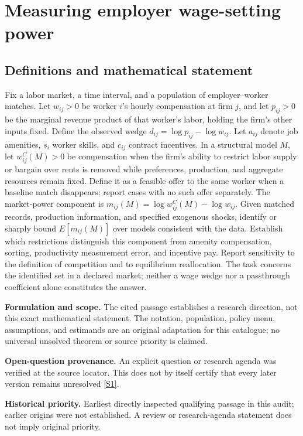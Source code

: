 \documentclass[11pt]{article}
\newcommand{\sref}[2]{\hyperlink{source:#1:#2}{[S#2]}}
\begin{document}
\section*{Measuring employer wage-setting power}\label{30007632}
\subsection{Definitions and mathematical statement}
Fix a labor market, a time interval, and a population of employer--worker matches. Let \(w_{ij}>0\) be worker \(i\)'s hourly compensation at firm \(j\), and let \(p_{ij}>0\) be the marginal revenue product of that worker's labor, holding the firm's other inputs fixed. Define the observed wedge \(d_{ij}=\log p_{ij}-\log w_{ij}\). Let \(a_{ij}\) denote job amenities, \(s_i\) worker skills, and \(c_{ij}\) contract incentives. In a structural model \(M\), let \(w^{C}_{ij}(M)>0\) be compensation when the firm's ability to restrict labor supply or bargain over rents is removed while preferences, production, and aggregate resources remain fixed. Define it as a feasible offer to the same worker when a baseline match disappears; report cases with no such offer separately. The market-power component is \(m_{ij}(M)=\log w^{C}_{ij}(M)-\log w_{ij}\). Given matched records, production information, and specified exogenous shocks, identify or sharply bound \(E[m_{ij}(M)]\) over models consistent with the data. Establish which restrictions distinguish this component from amenity compensation, sorting, productivity measurement error, and incentive pay. Report sensitivity to the definition of competition and to equilibrium reallocation. The task concerns the identified set in a declared market; neither a wage wedge nor a passthrough coefficient alone constitutes the answer.

\par\textbf{Formulation and scope.} The cited passage establishes a research direction, not this exact mathematical statement. The notation, population, policy menu, assumptions, and estimands are an original adaptation for this catalogue; no universal unsolved theorem or source priority is claimed.

\par\textbf{Open-question provenance.} An explicit question or research agenda was verified at the source locator. This does not by itself certify that every later version remains unresolved \sref{30007632}{1}.

\par\textbf{Historical priority.} Earliest directly inspected qualifying passage in this audit; earlier origins were not established. A review or research-agenda statement does not imply original priority.
\end{document}

